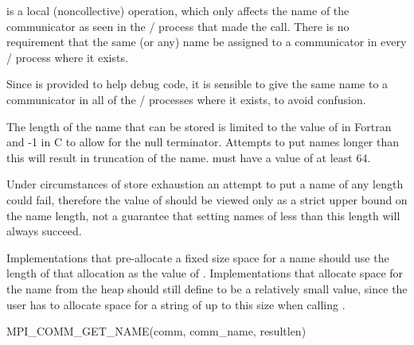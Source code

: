  is a local (noncollective) operation,
which only affects the name of the communicator as seen in the \MPI/ process
that made the  call. There is no
requirement that the same (or any) name be assigned to a communicator
in every \MPI/ process where it exists.

\begin{users}
Since  is provided to help debug code, it
is sensible to give the same name to a communicator in all of the
\MPI/ processes where it exists, to avoid confusion.
\end{users}

The length of the name that can be stored is limited to the value of
 in Fortran and
-1 in C to allow for the null terminator.
Attempts to put names longer than this
will result in truncation of the name.
 must have a value of at least 64.

\begin{users}
Under circumstances of store exhaustion an attempt to put a
name of any length could fail, therefore the value of
 should be viewed only as a strict upper
bound on the name length, not a guarantee that setting names of less
than this length will always succeed.
\end{users}

\begin{implementors}
Implementations that pre-allocate a fixed size space for a name
should use the length of that allocation as the value of
.
Implementations that allocate space for the name from the heap should
still define  to be a relatively small
value, since the user has to allocate space for a string of up to this
size when calling .
\end{implementors}

\begin{funcdef}{MPI\_COMM\_GET\_NAME}{(\mbox{comm}, \mbox{comm\_name}, \mbox{resultlen})}
\end{funcdef}

